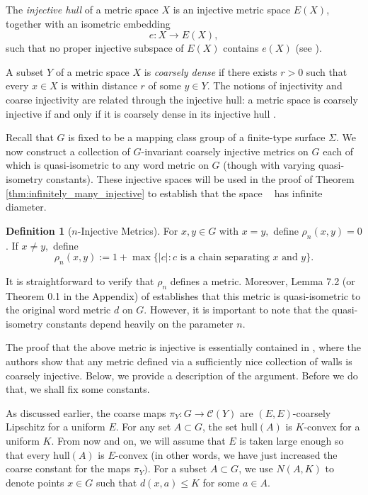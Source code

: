 \documentclass{amsart}
\numberwithin{thm}{section}
\numberwithin{figure}{section}
\theoremstyle{definition}
\theoremstyle{definition}
\newtheorem{defn}[thm]{Definition}
\theoremstyle{remark}
\newcommand{\hull}{\mathrm{hull}}
\numberwithin{equation}{section}
\DeclareMathOperator{\DDGS}{\mathcal{D}_{s}(G)}
\theoremstyle{plain}
\begin{document}
The \emph{injective hull} of a metric space $X$ is an injective metric space $E(X)$, together with an isometric embedding
\[
e \colon X \to E(X),
\]
such that no proper injective subspace of $E(X)$ contains $e(X)$ (see \cite[Section~3]{L13:Injective}).

A subset $Y$ of a metric space $X$ is \emph{coarsely dense} if there exists $r > 0$ such that every $x \in X$ is within distance $r$ of some $y \in Y$. The notions of injectivity and coarse injectivity are related through the injective hull: a metric space is coarsely injective if and only if it is coarsely dense in its injective hull \cite[Proposition~1]{haettelhodapetyt:coarse}.

Recall that $G$ is fixed to be a mapping class group of a finite-type surface $\Sigma.$ We now construct a collection of $G$-invariant coarsely injective metrics on $G$ each of which is quasi-isometric to any word metric on $G$ (though with varying quasi-isometry constants). These injective spaces will be used in the proof of Theorem \ref{thm:infinitely_many_injective} to establish that the space $\DDGS$ has infinite diameter.

\begin{defn}[$n$-Injective Metrics] For $x,y \in G$ with $x=y,$ define $\rho_n(x,y)=0$. If $x \neq y,$ define 
\[
\rho_n(x,y) := 1 + \max\{|c| : c \text{ is a chain separating } x \text{ and } y\}.
\]
\end{defn}

It is straightforward to verify that $\rho_n$ defines a metric. Moreover, Lemma 7.2 (or Theorem 0.1 in the Appendix) of \cite{zalloum:injectivity} establishes that this metric is quasi-isometric to the original word metric $d$ on $G$. However, it is important to note that the quasi-isometry constants depend heavily on the parameter $n$.

The proof that the above metric is injective is essentially contained in \cite{PetytZalloum24}, where the authors show that any metric defined via a sufficiently nice collection of walls is coarsely injective. Below, we provide a description of the argument. Before we do that, we shall fix some constants. 


As discussed earlier, the coarse maps $\pi_Y:G \rightarrow \mathcal{C}(Y)$ are $(E,E)$-coarsely Lipschitz for a uniform $E.$ For any set $A \subset G$, the set $\hull(A)$ is $K$-convex for a uniform $K.$ From now and on, we will assume that $E$ is taken large enough so that every $\hull(A)$ is $E$-convex (in other words, we have just increased the coarse constant for the maps $\pi_Y).$ For a subset $A \subset G$, we use $N(A,K)$ to denote points $x \in G$ such that $d(x,a) \leq K$ for some $a \in A.$
\end{document}
